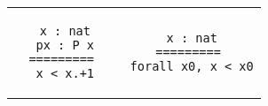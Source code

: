 \begin{landscape}
\begin{small}
\begin{multicols*}{3}[\begin{center}\section*{}\end{center}]
  \begin{tabular}{c@{$\to$}c}
  \begin{minipage}{0.15\textwidth}\begin{lstlisting}
   x : nat
   px : P x
  =========
   x < x.+1
  \end{lstlisting}\end{minipage}
  &
  \begin{minipage}{0.15\textwidth}\begin{lstlisting}
   x : nat
  =========
   forall x0, x < x0
  \end{lstlisting}\end{minipage}
  \end{tabular}


\end{multicols*}
\end{small}
\end{landscape}
